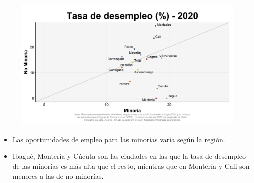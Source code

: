     \begin{figure}[H]
        \caption[Tasa de desempleo por ciudades por minorías y no minorías para 2020 ]{\label{desemp_minoria_ciudad_scatter} }
        \begin{center}
        \includegraphics[width=\textwidth,keepaspectratio]{img/var_43_scatter.png}
        \end{center}
    \end{figure}
            \begin{itemize}
                \item Las oportunidades de empleo para las minorías varía según la región.
                \item Ibagué, Montería y Cúcuta son las ciudades en las que la tasa de desempleo de las minorías es más alta que el resto, mientras que en Montería y Cali son menores a las de no minorías.
                \end{itemize}


